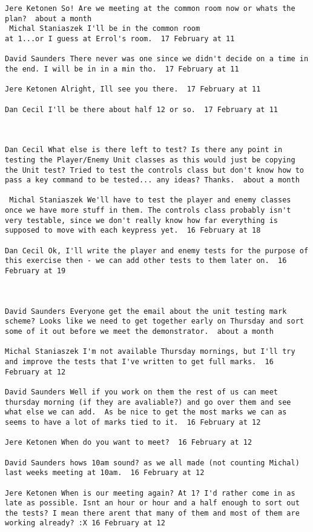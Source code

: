 \begin{verbatim}
Jere Ketonen So! Are we meeting at the common room now or whats the
plan?  about a month 
 Michal Staniaszek I'll be in the common room
at 1...or I guess at Errol's room.  17 February at 11

David Saunders There never was one since we didn't decide on a time in
the end. I will be in in a min tho.  17 February at 11

Jere Ketonen Alright, Ill see you there.  17 February at 11

Dan Cecil I'll be there about half 12 or so.  17 February at 11



Dan Cecil What else is there left to test? Is there any point in
testing the Player/Enemy Unit classes as this would just be copying
the Unit test? Tried to test the controls class but don't know how to
pass a key command to be tested... any ideas? Thanks.  about a month

 Michal Staniaszek We'll have to test the player and enemy classes
once we have more stuff in them. The controls class probably isn't
very testable, since we don't really know how far everything is
supposed to move with each keypress yet.  16 February at 18

Dan Cecil Ok, I'll write the player and enemy tests for the purpose of
this exercise then - we can add other tests to them later on.  16
February at 19



David Saunders Everyone get the email about the unit testing mark
scheme? Looks like we need to get together early on Thursday and sort
some of it out before we meet the demonstrator.  about a month 

Michal Staniaszek I'm not available Thursday mornings, but I'll try
and improve the tests that I've written to get full marks.  16
February at 12

David Saunders Well if you work on them the rest of us can meet
thursday morning (if they are avaliable?) and go over them and see
what else we can add.  As be nice to get the most marks we can as
seems to have a lot of marks tied to it.  16 February at 12

Jere Ketonen When do you want to meet?  16 February at 12

David Saunders hows 10am sound? as we all made (not counting Michal)
last weeks meeting at 10am.  16 February at 12

Jere Ketonen When is our meeting again? At 1? I'd rather come in as
late as possible. Isnt an hour or hour and a half enough to sort out
the tests? I mean there arent that many of them and most of them are
working already? :X 16 February at 12


\end{verbatim}
